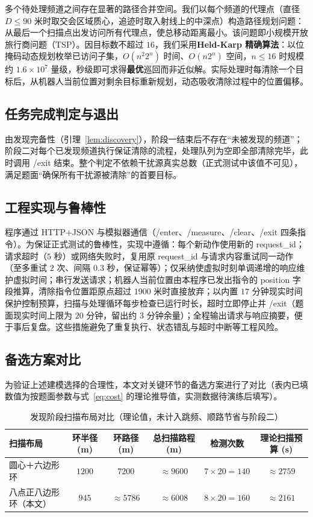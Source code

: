 \documentclass[12pt,a4paper]{ctexart}
\numberwithin{figure}{section}
\numberwithin{table}{section}
\numberwithin{equation}{section}
\begin{document}
多个待处理频道之间存在显著的路径合并空间。我们以每个频道的代理点（直径 $D\le90$ 米时取交会区域质心，追迹时取入射线上的中深点）构造路径规划问题：从最后一个扫描点出发访问所有代理点，使总移动距离最小。该问题即小规模开放旅行商问题（TSP）。因目标数不超过 $16$，我们采用\textbf{Held-Karp 精确算法}：以位掩码动态规划枚举已访问子集，$O(n^{2}2^{n})$ 时间、$O(n2^{n})$ 空间，$n\le16$ 时规模约 $1.6\times10^{7}$ 量级，秒级即可求得\textbf{最优}巡回而非近似解。实际处理时每清除一个目标后，从机器人当前位置对剩余目标重新规划，动态吸收清除过程中的位置偏移。

\subsection{任务完成判定与退出}

由发现完备性（引理~\ref{lem:discovery}），阶段一结束后不存在“未被发现的频道”；阶段二对每个已发现频道执行保证清除的流程，处理队列为空即全部清除完毕，此时调用 /exit 结束。整个判定不依赖干扰源真实总数（正式测试中该值不可见），满足题面“确保所有干扰源被清除”的首要目标。

\subsection{工程实现与鲁棒性}

程序通过 HTTP+JSON 与模拟器通信（/enter、/measure、/clear、/exit 四条指令）。为保证正式测试的鲁棒性，实现中遵循：每个新动作使用新的 request\_id；请求超时（$5$ 秒）或网络失败时，复用原 request\_id 与请求内容重试同一动作（至多重试 $2$ 次、间隔 $0.3$ 秒，保证幂等）；仅采纳使虚拟时刻单调递增的响应维护虚拟时间；串行发送请求；机器人当前位置由本程序已发出指令的 position 字段推算，清除指令位置距原点超过 $1900$ 米时直接放弃；以内置 $17$ 分钟现实时间保护控制预算，扫描与处理循环每步检查已运行时长，超时立即停止并 /exit（题面现实时间上限为 $20$ 分钟，留出约 $3$ 分钟余量）；全程输出请求与响应摘要，便于事后复盘。这些措施避免了重复执行、状态错乱与超时中断等工程风险。

\subsection{备选方案对比}

为验证上述建模选择的合理性，本文对关键环节的备选方案进行了对比（表内已填数值为按题面参数与式~\eqref{eq:cost} 的理论推导值，实测数据待演练后填写）。

\begin{table}[H]
\centering
\caption{发现阶段扫描布局对比（理论值，未计入跳频、顺路节省与阶段二）}
\label{tab:q3-compare-scan}
\begin{tabular}{lccccc}
\toprule
扫描布局 & 环半径 (m) & 环路径 (m) & 总扫描路程 (m) & 检测次数 & 理论扫描预算 (s) \\
\midrule
圆心＋六边形环 & $1200$ & $7200$ & $\approx9600$ & $7\times20=140$ & $\approx2759$ \\
八点正八边形环（本文） & $945$ & $\approx5786$ & $\approx6008$ & $8\times20=160$ & $\approx2161$ \\
\bottomrule
\end{tabular}
\end{table}
\end{document}
